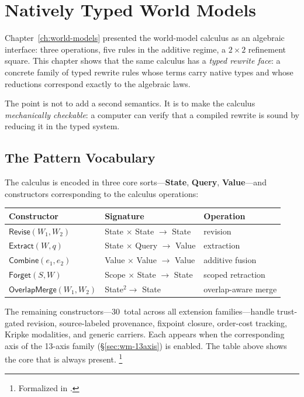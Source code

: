 \documentclass[11pt,openany]{report}
\begin{document}
\chapter{Natively Typed World Models}
\label{ch:typed}

Chapter~\ref{ch:world-models} presented the world-model calculus as
an algebraic interface: three operations, five rules in the additive
regime, a $2 \times 2$ refinement square.  This chapter shows that the
same calculus has a \emph{typed rewrite face}: a concrete family of
typed rewrite rules whose terms carry native types and whose reductions
correspond exactly to the algebraic laws.

The point is not to add a second semantics.  It is to make the
calculus \emph{mechanically checkable}: a computer can verify that a
compiled rewrite is sound by reducing it in the typed system.

\section{The Pattern Vocabulary}

The calculus is encoded in three core sorts---\textbf{State},
\textbf{Query}, \textbf{Value}---and constructors corresponding to
the calculus operations:

\medskip
\begin{center}
\begin{tabular}{lll}
\toprule
\textbf{Constructor} & \textbf{Signature} & \textbf{Operation} \\
\midrule
$\mathsf{Revise}(W_1, W_2)$ & State $\times$ State $\to$ State
  & revision \\
$\mathsf{Extract}(W, q)$ & State $\times$ Query $\to$ Value
  & extraction \\
$\mathsf{Combine}(e_1, e_2)$ & Value $\times$ Value $\to$ Value
  & additive fusion \\
$\mathsf{Forget}(S, W)$ & Scope $\times$ State $\to$ State
  & scoped retraction \\
$\mathsf{OverlapMerge}(W_1, W_2)$ & State$^2 \to$ State
  & overlap-aware merge \\
\bottomrule
\end{tabular}
\end{center}
\medskip

\noindent
The remaining constructors---30~total across all extension
families---handle trust-gated revision, source-labeled provenance,
fixpoint closure, order-cost tracking, Kripke modalities, and generic
carriers.  Each appears when the corresponding axis of the 13-axis
family (\S\ref{sec:wm-13axis}) is enabled.  The table above shows the
core that is always present.%
\footnote{Formalized in
.}
\end{document}
